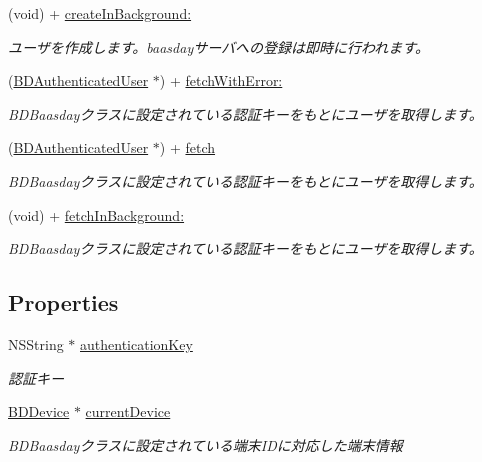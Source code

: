\begin{DoxyCompactItemize}
(void) + \hyperlink{interface_b_d_authenticated_user_a00f0e6a4344a98ca5502b30a9b4aeffc}{create\-In\-Background\-:}
\begin{DoxyCompactList}\small\item\em ユーザを作成します。baasdayサーバへの登録は即時に行われます。 \end{DoxyCompactList}\item 
(\hyperlink{interface_b_d_authenticated_user}{B\-D\-Authenticated\-User} $\ast$) + \hyperlink{interface_b_d_authenticated_user_a269a9fbd9bb90595d3b96330bc2afc1a}{fetch\-With\-Error\-:}
\begin{DoxyCompactList}\small\item\em B\-D\-Baasdayクラスに設定されている認証キーをもとにユーザを取得します。 \end{DoxyCompactList}\item 
(\hyperlink{interface_b_d_authenticated_user}{B\-D\-Authenticated\-User} $\ast$) + \hyperlink{interface_b_d_authenticated_user_a74733c1f5a2537c1dceffce72effb93e}{fetch}
\begin{DoxyCompactList}\small\item\em B\-D\-Baasdayクラスに設定されている認証キーをもとにユーザを取得します。 \end{DoxyCompactList}\item 
(void) + \hyperlink{interface_b_d_authenticated_user_ad51bed700833f0d6a5cc5b2b017fef97}{fetch\-In\-Background\-:}
\begin{DoxyCompactList}\small\item\em B\-D\-Baasdayクラスに設定されている認証キーをもとにユーザを取得します。 \end{DoxyCompactList}\end{DoxyCompactItemize}
\subsection*{Properties}
\begin{DoxyCompactItemize}
\item 
N\-S\-String $\ast$ \hyperlink{interface_b_d_authenticated_user_adbd855742b73eb440cb118ff190e8851}{authentication\-Key}
\begin{DoxyCompactList}\small\item\em 認証キー \end{DoxyCompactList}\item 
\hyperlink{interface_b_d_device}{B\-D\-Device} $\ast$ \hyperlink{interface_b_d_authenticated_user_a7accdee844c94453ec3d8fd61c7bdc41}{current\-Device}
\begin{DoxyCompactList}\small\item\em B\-D\-Baasdayクラスに設定されている端末\-I\-Dに対応した端末情報 \end{DoxyCompactList}\end{DoxyCompactItemize}



